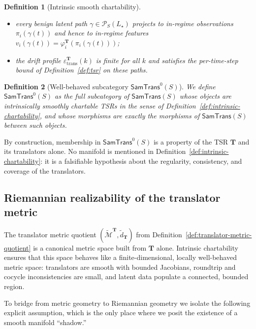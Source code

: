 \documentclass[11pt]{article}
\newtheorem{definition}{Definition}
\newcommand{\SamTrans}{\mathsf{SamTrans}}
\begin{document}
\begin{definition}[Intrinsic smooth chartability]
\begin{enumerate}[]
\begin{itemize}
          \item every benign latent path $\gamma \in \mathcal{P}_S(L_\star)$
                projects to in-regime observations $\pi_i(\gamma(t))$ and
                hence to in-regime features
                $v_i(\gamma(t)) = \varphi_i^{\mathbf{T}}(\pi_i(\gamma(t)))$;
          \item the drift profile $\varepsilon_{\mathrm{trans}}^{\mathbf{T}}(k)$
                is finite for all $k$ and satisfies the per-time-step bound
                of Definition~\ref{def:tsr} on these paths.
        \end{itemize}
\end{enumerate}
\end{definition}

\begin{definition}[Well-behaved subcategory $\SamTrans^0(S)$]
\label{def:samtrans0}
We define $\SamTrans^0(S)$ as the full subcategory of
$\SamTrans(S)$ whose objects are intrinsically smoothly chartable
TSRs in the sense of Definition~\ref{def:intrinsic-chartability}, and whose
morphisms are exactly the morphisms of $\SamTrans(S)$ between
such objects.
\end{definition}

By construction, membership in $\SamTrans^0(S)$ is a property of the TSR
$\mathbf{T}$ and its translators alone.  No manifold is mentioned in
Definition~\ref{def:intrinsic-chartability}: it is a falsifiable hypothesis
about the regularity, consistency, and coverage of the translators.

\subsection{Riemannian realizability of the translator metric}
\label{subsec:riemannian-realizability}

The translator metric quotient
$(\widetilde{\mathcal{M}}^{\mathbf{T}}, \tilde d_{\mathbf{T}})$ from
Definition~\ref{def:translator-metric-quotient} is a canonical metric space
built from $\mathbf{T}$ alone.  Intrinsic chartability ensures that this
space behaves like a finite-dimensional, locally well-behaved metric
space: translators are smooth with bounded Jacobians, roundtrip and
cocycle inconsistencies are small, and latent data populate a connected,
bounded region.

To bridge from metric geometry to Riemannian geometry we isolate the
following explicit assumption, which is the only place where we posit
the existence of a smooth manifold ``shadow.''
\end{document}
